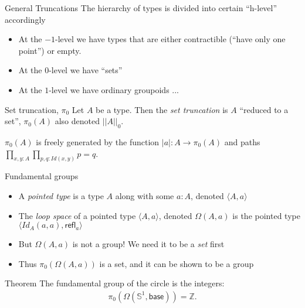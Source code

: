 \documentclass{beamer}
\newcommand{\eq}[1]{\begin{align*} #1 \end{align*}}
\newcommand{\bra}[1]{\langle #1\rangle}
\newcommand{\refl}{\mathsf{refl}}
\begin{document}

\begin{frame}{General Truncations}
The hierarchy of types is divided into certain ``h-level'' accordingly
	 \begin{itemize}
	 \pause\item At the $-1$-level we have types that are either contractible (``have only one point'') or empty. 
	 \pause\item At the $0$-level we have ``sets''
	 \pause\item At the $1$-level we have ordinary groupoids ...
	 \end{itemize}

	
	\pause\begin{block}{Set truncation, $\pi_0$}
	Let $A$ be a type. Then the \textit{set truncation} is $A$ ``reduced to a set'', $\pi_0(A)$ also denoted $|| A ||_0$. 
	\end{block}
	\pause $\pi_0(A)$ is freely generated by the function $|a|:A\to \pi_0(A)$ and paths $\prod_{x,y:A}\prod_{p,q:Id(x,y)}p=q$.
\end{frame}


\begin{frame}{Fundamental groups}
	\begin{itemize}	
	\pause\item A \textit{pointed type} is a type $A$ along with some $a:A$, denoted $\bra{A,a}$
	\pause\item The \textit{loop space} of a pointed type $\bra{A,a}$, denoted $\Omega(A,a)$ is the pointed type $\bra{Id_A(a,a),\refl_a}$
	\pause\item But $\Omega(A,a)$ is not a group! \pause We need it to be a \textit{set} first
	\pause\item Thus $\pi_0(\Omega(A,a))$ is a set, and it can be shown to be a group
	\end{itemize}
	
	\pause\begin{block}{Theorem}
	The fundamental group of the circle is the integers:
	\eq{
	\pi_0(\Omega(\mathbb{S}^1,\mathsf{base})) = \mathbb{Z}.
	}
	\end{block}
\end{frame}
\end{document}
